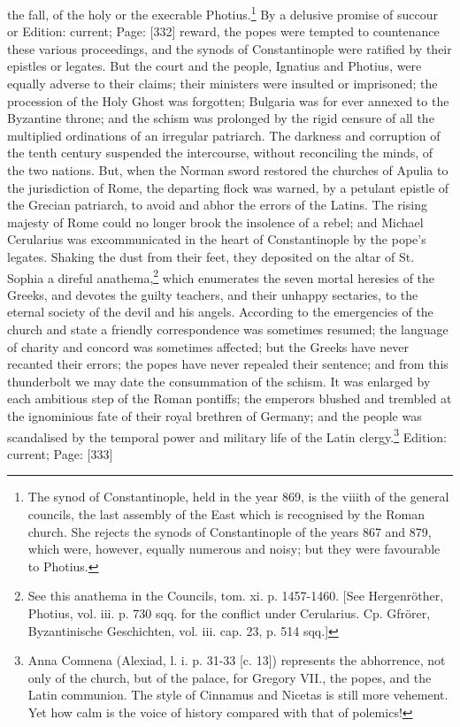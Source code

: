 the fall, of the holy or the execrable Photius.\footnote{The synod of Constantinople, held in the year 869, is the viiith of the general councils, the last assembly of the East which is recognised by the Roman church. She rejects the synods of Constantinople of the years 867 and 879, which were, however, equally numerous and noisy; but they were favourable to Photius.} By a delusive promise of succour or Edition: current; Page: [332] reward, the popes were tempted to countenance these various proceedings, and the synods of Constantinople were ratified by their epistles or legates. But the court and the people, Ignatius and Photius, were equally adverse to their claims; their ministers were insulted or imprisoned; the procession of the Holy Ghost was forgotten; Bulgaria was for ever annexed to the Byzantine throne; and the schism was prolonged by the rigid censure of all the multiplied ordinations of an irregular patriarch. The darkness and corruption of the tenth century suspended the intercourse, without reconciling the minds, of the two nations. But, when the Norman sword restored the churches of Apulia to the jurisdiction of Rome, the departing flock was warned, by a petulant epistle of the Grecian patriarch, to avoid and abhor the errors of the Latins. The rising majesty of Rome could no longer brook the insolence of a rebel; and Michael Cerularius was excommunicated in the heart of Constantinople by the pope\texthebrew{}’s legates. Shaking the dust from their feet, they deposited on the altar of St. Sophia a direful anathema,\footnote{See this anathema in the Councils, tom. xi. p. 1457-1460. [See Hergenröther, Photius, vol. iii. p. 730 sqq. for the conflict under Cerularius. Cp. Gfrörer, Byzantinische Geschichten, vol. iii. cap. 23, p. 514 sqq.]} which enumerates the seven mortal heresies of the Greeks, and devotes the guilty teachers, and their unhappy sectaries, to the eternal society of the devil and his angels. According to the emergencies of the church and state a friendly correspondence was sometimes resumed; the language of charity and concord was sometimes affected; but the Greeks have never recanted their errors; the popes have never repealed their sentence; and from this thunderbolt we may date the consummation of the schism. It was enlarged by each ambitious step of the Roman pontiffs; the emperors blushed and trembled at the ignominious fate of their royal brethren of Germany; and the people was scandalised by the temporal power and military life of the Latin clergy.\footnote{Anna Comnena (Alexiad, l. i. p. 31-33 [c. 13]) represents the abhorrence, not only of the church, but of the palace, for Gregory VII., the popes, and the Latin communion. The style of Cinnamus and Nicetas is still more vehement. Yet how calm is the voice of history compared with that of polemics!}
Edition: current; Page: [333]


